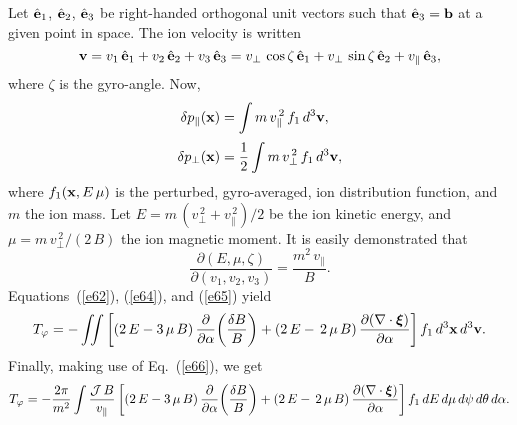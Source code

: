 \documentclass[12pt,prb,aps,notitlepage]{revtex4-1}
\newcommand{\bxi}{\mbox{\boldmath$\xi$}}
\begin{document}
 Let $\hat{\bf e}_1$, $\hat{\bf e}_2$, $\hat{\bf e}_3$ be right-handed orthogonal unit vectors such that $\hat{\bf e}_3={\bf b}$ at a given
 point in space. The ion velocity is written
 \begin{equation}
 {\bf v} = v_1\,\hat{\bf e}_1 + v_2\,\hat{\bf e}_2+v_3\,\hat{\bf e}_3= v_\perp\,\cos\zeta\,\hat{\bf e}_1+ v_\perp\,\sin\zeta\,\hat{\bf e}_2+ 
 v_\parallel\,\hat{\bf e}_3,
 \end{equation}
 where $\zeta$ is the gyro-angle. 
 Now, 
 \begin{align}\label{e64}
 \delta p_\parallel({\bf x}) &= \int m\,v_\parallel^{\,2}\,f_1\,d^3{\bf v},\\[0.5ex]
 \delta p_\perp({\bf x}) &= \frac{1}{2}\int m\,v_\perp^{\,2}\,f_1\,d^3{\bf v},\label{e65}
 \end{align}
 where $f_1({\bf x},E\,\mu)$ is the perturbed, gyro-averaged, ion distribution function, and $m$  the ion mass. Let
 $E=m\,(v_\perp^{\,2}+v_\parallel^{\,2})/2$ be the ion kinetic energy,  and $\mu=m\,v_\perp^{\,2}/(2\,B)$ the ion magnetic moment. 
 It is easily demonstrated that
 \begin{equation}\label{e66}
 \frac{\partial (E,\mu,\zeta)}{\partial(v_1,v_2,v_3)} = \frac{m^2\,v_\parallel}{B}.
 \end{equation}
 Equations~(\ref{e62}), (\ref{e64}), and (\ref{e65}) yield
 \begin{equation}
 T_\varphi =-\int\!\!\!\int \left[(2\,E-3\,\mu\,B)\,\frac{\partial}{\partial\alpha}\!\left(\frac{\delta B}{B}\right) + (2\,E-\,2\,\mu\,B)\,\frac{\partial(\nabla\cdot\bxi)}{\partial\alpha}\right]f_1\,d^3{\bf x}\,d^3{\bf v}.
 \end{equation}
 Finally, making use of Eq.~(\ref{e66}), we get
 \begin{equation}\label{e92x}
 T_\varphi = -\frac{2\pi}{m^2}\int \frac{{\cal J}\,B}{v_\parallel}\left[(2\,E-3\,\mu\,B)\,\frac{\partial}{\partial\alpha}\!\left(\frac{\delta B}{B}\right) + (2\,E-\,2\,\mu\,B)\,\frac{\partial(\nabla\cdot\bxi)}{\partial\alpha}\right]f_1\,dE\,d\mu\,d\psi\,d\theta\,d\alpha.
 \end{equation}
 
\end{document}
